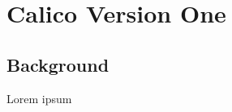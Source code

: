 \chapter{Calico Version One}
\label{chapter:calico-version-one}

\section{Background}

Lorem ipsum


